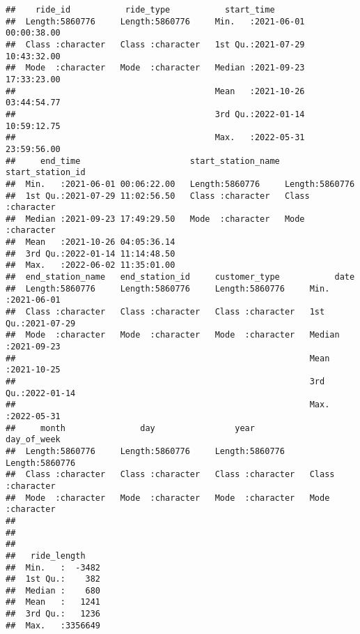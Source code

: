 \documentclass[
]{article}
\newenvironment{Shaded}{\begin{snugshade}}{\end{snugshade}}
\newcommand{\FunctionTok}[1]{\textcolor[rgb]{0.00,0.00,0.00}{#1}}
\newcommand{\NormalTok}[1]{#1}
\newcommand{\SpecialCharTok}[1]{\textcolor[rgb]{0.00,0.00,0.00}{#1}}
\begin{document}
\begin{verbatim}
##    ride_id           ride_type           start_time                    
##  Length:5860776     Length:5860776     Min.   :2021-06-01 00:00:38.00  
##  Class :character   Class :character   1st Qu.:2021-07-29 10:43:32.00  
##  Mode  :character   Mode  :character   Median :2021-09-23 17:33:23.00  
##                                        Mean   :2021-10-26 03:44:54.77  
##                                        3rd Qu.:2022-01-14 10:59:12.75  
##                                        Max.   :2022-05-31 23:59:56.00  
##     end_time                      start_station_name start_station_id  
##  Min.   :2021-06-01 00:06:22.00   Length:5860776     Length:5860776    
##  1st Qu.:2021-07-29 11:02:56.50   Class :character   Class :character  
##  Median :2021-09-23 17:49:29.50   Mode  :character   Mode  :character  
##  Mean   :2021-10-26 04:05:36.14                                        
##  3rd Qu.:2022-01-14 11:14:48.50                                        
##  Max.   :2022-06-02 11:35:01.00                                        
##  end_station_name   end_station_id     customer_type           date           
##  Length:5860776     Length:5860776     Length:5860776     Min.   :2021-06-01  
##  Class :character   Class :character   Class :character   1st Qu.:2021-07-29  
##  Mode  :character   Mode  :character   Mode  :character   Median :2021-09-23  
##                                                           Mean   :2021-10-25  
##                                                           3rd Qu.:2022-01-14  
##                                                           Max.   :2022-05-31  
##     month               day                year           day_of_week       
##  Length:5860776     Length:5860776     Length:5860776     Length:5860776    
##  Class :character   Class :character   Class :character   Class :character  
##  Mode  :character   Mode  :character   Mode  :character   Mode  :character  
##                                                                             
##                                                                             
##                                                                             
##   ride_length     
##  Min.   :  -3482  
##  1st Qu.:    382  
##  Median :    680  
##  Mean   :   1241  
##  3rd Qu.:   1236  
##  Max.   :3356649
\end{verbatim}

\begin{Shaded}
\end{Shaded}
\end{document}
